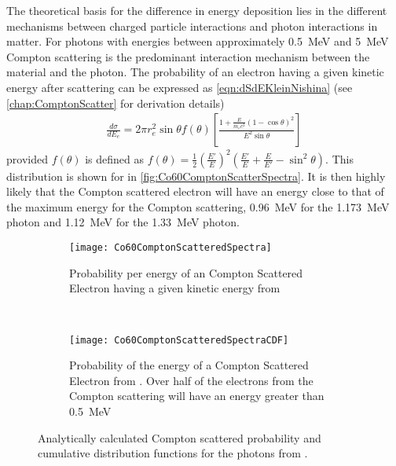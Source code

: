 The theoretical basis for the difference in energy deposition lies in the different mechanisms between charged particle interactions and photon interactions in matter.
For photons with energies between approximately \SI{0.5}{\MeV} and \SI{5}{\MeV} Compton scattering is the predominant interaction mechanism between the material and the photon.
The probability of an electron having a given kinetic energy after scattering can be expressed as \autoref{eqn:dSdEKleinNishina} (see \autoref{chap:ComptonScatter} for derivation details)
\begin{align}
  \label{eqn:dSdEKleinNishina}
\frac{d\sigma}{dE_e} = 2\pi r_e^2 \sin \theta f(\theta)\left [ \frac{1+\frac{E}{m_e c^2}\left(1-\cos\theta \right)^2}{E^2 \sin \theta} \right ]
\end{align}
provided  $f(\theta)$ is defined as $f(\theta) = \frac{1}{2}\left(\frac{E'}{E}\right)^2 \left(\frac{E'}{E} + \frac{E}{E'}-\sin^2\theta\right)$.
This distribution is shown for  in \autoref{fig:Co60ComptonScatterSpectra}.
It is then highly likely that the Compton scattered electron will have an energy close to that of the maximum energy for the Compton scattering, \SI{0.96}{\MeV} for the \SI{1.173}{\MeV} photon and \SI{1.12}{\MeV} for the \SI{1.33}{\MeV} photon.
\begin{figure}
  \centering
  \begin{subfigure}[b]{0.45\textwidth}
    \texttt{[image: Co60ComptonScatteredSpectra]}
    \caption{Probability per energy of an Compton Scattered Electron having a given kinetic energy from }
    \label{fig:Co60ComptonScatterSpectra}
  \end{subfigure}%
  ~
  \begin{subfigure}[b]{0.45\textwidth}
    \texttt{[image: Co60ComptonScatteredSpectraCDF]}
    \caption{Probability of the energy of a Compton Scattered Electron from . Over half of the electrons from the Compton scattering will have an energy greater than \SI{0.5}{\MeV}}
    \label{fig:Co60ComptonScatterCDF}
  \end{subfigure}
  \caption[Analytical Co-60 Compton Scattered Spectra]{Analytically calculated Compton scattered probability and cumulative distribution functions for the photons from .}
\end{figure}
